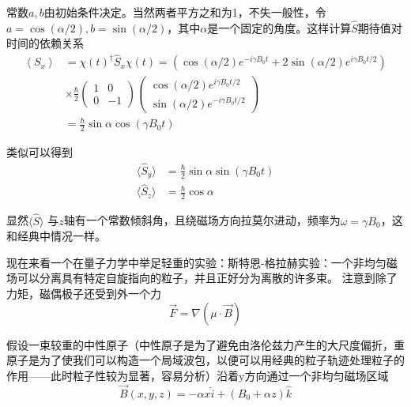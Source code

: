 \documentclass[UTF8]{ctexart}
\begin{document}
\noindent 常数$a,b$由初始条件决定。当然两者平方之和为1，不失一般性，令$a = \cos (\alpha/2), b = \sin (\alpha /2)$，其中$\alpha$是一个固定的角度。这样计算$\hat{S}$期待值对时间的依赖关系
\begin{equation}
\begin{aligned}\left\langle S_{x}\right\rangle&= \chi(t)^{\dagger} \hat{S}_{x} \chi(t)=\left(\cos (\alpha / 2) e^{-i \gamma B_{0} t}+2 \sin (\alpha / 2) e^{i \gamma B_{0} t / 2}\right) \\ & \times \frac{\hbar}{2}\left(\begin{array}{cc}{1} & {0} \\ {0} & {-1}\end{array}\right)\left(\begin{array}{c}{\cos (\alpha / 2) e^{i \gamma B_{0} t / 2}} \\ {\sin (\alpha / 2) e^{-i \gamma B_{0} t / 2}}\end{array}\right) \\&=\frac{\hbar}{2} \sin \alpha \cos \left(\gamma B_{0} t\right) \end{aligned}
\end{equation}

\noindent 类似可以得到 
\begin{equation}
    \begin{aligned}
        \langle \hat{S}_y \rangle &= \frac{\hbar}{2} \sin \alpha \sin (\gamma B_0 t) \\ 
        \langle \hat{S}_z \rangle &= \frac{\hbar}{2} \cos \alpha
    \end{aligned}
\end{equation}

\noindent 显然$\langle \hat{S} \rangle $ 与$z$轴有一个常数倾斜角，且绕磁场方向拉莫尔进动，频率为$\omega = \gamma B_0$，这和经典中情况一样。

    现在来看一个在量子力学中举足轻重的实验：斯特恩-格拉赫实验：一个非均匀磁场可以分离具有特定自旋指向的粒子，并且正好分为离散的许多束。 注意到除了力矩，磁偶极子还受到外一个力
    \begin{equation}
        \vec{F} = \nabla (\mu \cdot \vec{B})
    \end{equation}

\noindent 假设一束较重的中性原子（中性原子是为了避免由洛伦兹力产生的大尺度偏折，重原子是为了使我们可以构造一个局域波包，以便可以用经典的粒子轨迹处理粒子的作用——此时粒子性较为显著，容易分析）沿着y方向通过一个非均匀磁场区域
\begin{equation}
    \vec{B} (x,y,z) = - \alpha x \hat{i} + (B_0 + \alpha z) \hat{k}
\end{equation}
\end{document}
